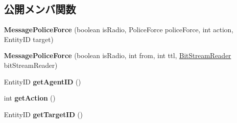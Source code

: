 \subsection*{公開メンバ関数}
\begin{DoxyCompactItemize}
\item 
\hypertarget{classadf_1_1agent_1_1communication_1_1standard_1_1bundle_1_1information_1_1MessagePoliceForce_a89e395d8f2bfeb6bdc44019707754255}{}\label{classadf_1_1agent_1_1communication_1_1standard_1_1bundle_1_1information_1_1MessagePoliceForce_a89e395d8f2bfeb6bdc44019707754255} 
{\bfseries Message\+Police\+Force} (boolean is\+Radio, Police\+Force police\+Force, int action, Entity\+ID target)
\item 
\hypertarget{classadf_1_1agent_1_1communication_1_1standard_1_1bundle_1_1information_1_1MessagePoliceForce_a6cfcb4f71f6c2616dbc0157b7e1acb08}{}\label{classadf_1_1agent_1_1communication_1_1standard_1_1bundle_1_1information_1_1MessagePoliceForce_a6cfcb4f71f6c2616dbc0157b7e1acb08} 
{\bfseries Message\+Police\+Force} (boolean is\+Radio, int from, int ttl, \hyperlink{classadf_1_1component_1_1communication_1_1util_1_1BitStreamReader}{Bit\+Stream\+Reader} bit\+Stream\+Reader)
\item 
\hypertarget{classadf_1_1agent_1_1communication_1_1standard_1_1bundle_1_1information_1_1MessagePoliceForce_afa4a3e799233f3c04b2f3a6ee26cc909}{}\label{classadf_1_1agent_1_1communication_1_1standard_1_1bundle_1_1information_1_1MessagePoliceForce_afa4a3e799233f3c04b2f3a6ee26cc909} 
Entity\+ID {\bfseries get\+Agent\+ID} ()
\item 
\hypertarget{classadf_1_1agent_1_1communication_1_1standard_1_1bundle_1_1information_1_1MessagePoliceForce_a1e7966a9add691b5a3f24afecfab5e28}{}\label{classadf_1_1agent_1_1communication_1_1standard_1_1bundle_1_1information_1_1MessagePoliceForce_a1e7966a9add691b5a3f24afecfab5e28} 
int {\bfseries get\+Action} ()
\item 
\hypertarget{classadf_1_1agent_1_1communication_1_1standard_1_1bundle_1_1information_1_1MessagePoliceForce_a44e1129391b6bc20ad5034f0d0464a7e}{}\label{classadf_1_1agent_1_1communication_1_1standard_1_1bundle_1_1information_1_1MessagePoliceForce_a44e1129391b6bc20ad5034f0d0464a7e} 
Entity\+ID {\bfseries get\+Target\+ID} ()
\item 
\hypertarget{classadf_1_1agent_1_1communication_1_1standard_1_1bundle_1_1information_1_1MessagePoliceForce_a55f162ccde7c3e6059f6bc35306a3047}{}\label{classadf_1_1agent_1_1communication_1_1standard_1_1bundle_1_1information_1_1MessagePoliceForce_a55f162ccde7c3e6059f6bc35306a3047} 

\end{DoxyCompactItemize}
